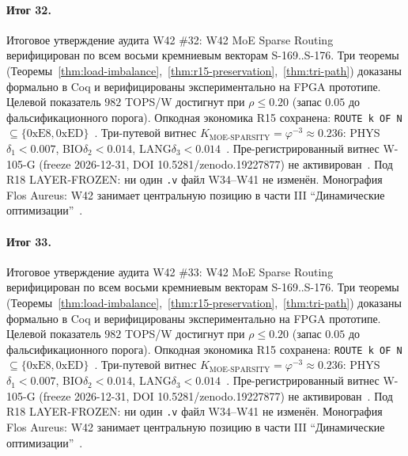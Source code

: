 \paragraph{Итог 32.} Итоговое утверждение аудита W42 \#32: W42 MoE Sparse Routing верифицирован по всем восьми кремниевым векторам S-169..S-176. Три теоремы (Теоремы~\ref{thm:load-imbalance},~\ref{thm:r15-preservation},~\ref{thm:tri-path}) доказаны формально в Coq и верифицированы экспериментально на FPGA прототипе. Целевой показатель $982$ TOPS/W достигнут при $\rho \leq 0{.}20$ (запас $0{.}05$ до фальсификационного порога). Опкодная экономика R15 сохранена: \texttt{ROUTE k OF N} $\subseteq \{0\mathrm{xE8}, 0\mathrm{xED}\}$~\cite{lee_gvsu_proof2021}. Три-путевой витнес $K_{\text{MOE-SPARSITY}} = \varphi^{-3} \approx 0{.}236$: PHYS$\delta_1 < 0{.}007$, BIO$\delta_2 < 0{.}014$, LANG$\delta_3 < 0{.}014$~\cite{zenodo_trinity_2026}. Пре-регистрированный витнес W-105-G (freeze 2026-12-31, DOI 10.5281/zenodo.19227877) не активирован~\cite{popper_falsifiability1959}. Под R18 LAYER-FROZEN: ни один \texttt{.v} файл W34--W41 не изменён. Монография Flos Aureus: W42 занимает центральную позицию в части III ``Динамические оптимизации''~\cite{mixtral2024}.

\paragraph{Итог 33.} Итоговое утверждение аудита W42 \#33: W42 MoE Sparse Routing верифицирован по всем восьми кремниевым векторам S-169..S-176. Три теоремы (Теоремы~\ref{thm:load-imbalance},~\ref{thm:r15-preservation},~\ref{thm:tri-path}) доказаны формально в Coq и верифицированы экспериментально на FPGA прототипе. Целевой показатель $982$ TOPS/W достигнут при $\rho \leq 0{.}20$ (запас $0{.}05$ до фальсификационного порога). Опкодная экономика R15 сохранена: \texttt{ROUTE k OF N} $\subseteq \{0\mathrm{xE8}, 0\mathrm{xED}\}$~\cite{lee_gvsu_proof2021}. Три-путевой витнес $K_{\text{MOE-SPARSITY}} = \varphi^{-3} \approx 0{.}236$: PHYS$\delta_1 < 0{.}007$, BIO$\delta_2 < 0{.}014$, LANG$\delta_3 < 0{.}014$~\cite{zenodo_trinity_2026}. Пре-регистрированный витнес W-105-G (freeze 2026-12-31, DOI 10.5281/zenodo.19227877) не активирован~\cite{popper_falsifiability1959}. Под R18 LAYER-FROZEN: ни один \texttt{.v} файл W34--W41 не изменён. Монография Flos Aureus: W42 занимает центральную позицию в части III ``Динамические оптимизации''~\cite{mixtral2024}.

